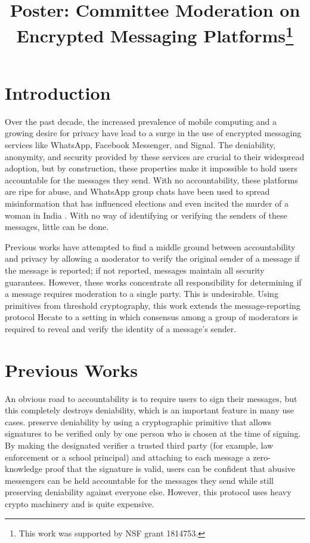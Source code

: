 \documentclass[conference]{IEEEtran}
\title{Poster: Committee Moderation on Encrypted Messaging Platforms\thanks{This work was supported by NSF grant 1814753.}}
\author{
    \IEEEauthorblockN{Alistair Pattison}
    \IEEEauthorblockA{
        \textit{Carleton College, University of Minnesota} \\
        pattisona@carleton.edu
    } \and
    \IEEEauthorblockN{Nicholas Hopper}
    \IEEEauthorblockA{
        \textit{University of Minnesota} \\
        hoppernj@umn.edu
    }
}
\begin{document}
\maketitle

\section{Introduction}

Over the past decade, the increased prevalence of mobile computing and a growing desire for privacy have lead to a surge in the use of encrypted messaging services like WhatsApp, Facebook Messenger, and Signal.
The deniability, anonymity, and security provided by these services are crucial to their widespread adoption, but by construction, these properties make it impossible to hold users accountable for the messages they send.
With no accountability, these platforms are ripe for abuse, and WhatsApp group chats have been used to spread misinformation that has influenced elections \cite{pbs-brazil-whatsapp,oxford-computational-propoganda-report} and even incited the murder of a woman in India \cite{nytimes-whatsapp-india-murder}.
With no way of identifying or verifying the senders of these messages, little can be done.

Previous works \cite{hecate, tglmr} have attempted to find a middle ground between accountability and privacy by allowing a moderator to verify the original sender of a message if the message is reported; if not reported, messages maintain all security guarantees.
However, these works concentrate all responsibility  for determining if a message requires moderation to a single party.
This is undesirable.
Using primitives from threshold cryptography, this work extends the message-reporting protocol Hecate \cite{hecate} to a setting in which consensus among a group of moderators is required to reveal and verify the identity of a message's sender.

\section{Previous Works}

An obvious road to accountability is to require users to sign their messages, but this completely destroys deniability, which is an important feature in many use cases.
\textcite{tglmr} preserve deniability by using a cryptographic primitive that allows signatures to be verified only by one person who is chosen at the time of signing.
By making the designated verifier a trusted third party (for example, law enforcement or a school principal) and attaching to each message a zero-knowledge proof that the signature is valid, users can be confident that abusive messengers can be held accountable for the messages they send while still preserving deniability against everyone else.
However, this protocol uses heavy crypto machinery and is quite expensive.
\end{document}
